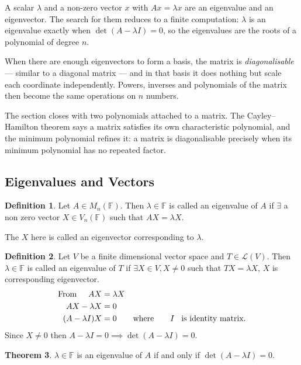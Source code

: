 \documentclass[11pt,a4paper]{article}
\theoremstyle{definition}
\newtheorem{thm}{Theorem}[subsection]
\newtheorem{defn}[thm]{Definition}
\begin{document}
A scalar $\lambda$ and a non-zero vector $x$ with $Ax=\lambda x$ are an
eigenvalue and an eigenvector. The search for them reduces to a finite
computation: $\lambda$ is an eigenvalue exactly when $\det(A-\lambda I)=0$, so
the eigenvalues are the roots of a polynomial of degree $n$.

When there are enough eigenvectors to form a basis, the matrix is
\emph{diagonalisable} --- similar to a diagonal matrix --- and in that basis it
does nothing but scale each coordinate independently. Powers, inverses and
polynomials of the matrix then become the same operations on $n$ numbers.

The section closes with two polynomials attached to a matrix. The
Cayley--Hamilton theorem says a matrix satisfies its own characteristic
polynomial, and the minimum polynomial refines it: a matrix is diagonalisable
precisely when its minimum polynomial has no repeated factor.



\subsection{Eigenvalues and Vectors}


\begin{defn}
Let $A\in M_n(\mathbb{F})$. Then $\lambda \in \mathbb{F}$ is called an eigenvalue of $A$ if $\exists$ a non zero vector $X\in V_n(\mathbb{F})$ such that $AX=\lambda X$.

The $X$ here is called an eigenvector corresponding to $\lambda$.
\end{defn}


\begin{defn}
Let $V$ be a finite dimensional vector space and $T\in \mathcal{L}(V)$. Then $\lambda \in \mathbb{F}$ is called an eigenvalue of $T$ if $\exists X\in V, X\neq 0$ such that $TX=\lambda X$, $X$ is corresponding eigenvector.
\begin{align*}
\text{From}\hspace{0.5cm} AX &=\lambda X\\
                          AX-\lambda X &=0\\
                          (A-\lambda I)X &=0\qquad\text{where}\qquad  I\hspace{0.3cm}\text{is identity matrix}.
\end{align*}
Since $X\neq 0$ then $A-\lambda I=0\implies \det (A-\lambda I)=0$.
\end{defn}


\begin{thm}\label{thm:eigen-det}
$\lambda \in \mathbb{F}$ is an eigenvalue of $A$ if and only if
$\det (A-\lambda I)=0$.
\end{thm}
\end{document}
